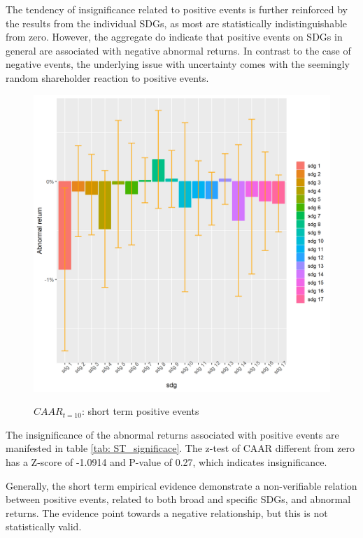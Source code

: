 The tendency of insignificance related to positive events is further reinforced by the results from the individual SDGs, as most are statistically indistinguishable from zero. However, the aggregate do indicate that positive events on SDGs in general are associated with negative abnormal returns. In contrast to the case of negative events, the underlying issue with uncertainty comes with the seemingly random shareholder reaction to positive events.  
 
\begin{figure} [H]
    \centering
    \caption{$CAAR_{t=10}$: short term positive events}
    \includegraphics[scale=0.6]{Projekt/1.Figures analysis/ST_positive_sdg_bar.png}
    \label{fig:ST_pos_bar}
\end{figure}



The insignificance of the abnormal returns associated with positive events are manifested in table \ref{tab: ST_significace}. The z-test of CAAR different from zero has a Z-score of -1.0914 and P-value of 0.27, which indicates insignificance. 

Generally, the short term empirical evidence demonstrate a non-verifiable relation between positive events, related to both broad and specific SDGs, and abnormal returns. The evidence point towards a negative relationship, but this is not statistically valid. 


